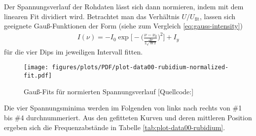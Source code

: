 \noindent Der Spannungsverlauf der Rohdaten lässt sich dann normieren, indem mit dem linearen Fit dividiert wird. Betrachtet man das Verhältnis $U/U_{\text{fit}}$,
lassen sich geeignete Gauß-Funktionen der Form (siehe zum Vergleich \eqref{eq:gauss-intensity})
\begin{align}
    I(\nu) = - I_{0} \exp \biggl[- \biggl( \frac{\nu - \nu_{0}}{\frac{\Delta \nu}{2 \sqrt{\ln 2}}} \biggr)^2 \biggr] + I_{y}
    \label{eq:gauss-fit}
\end{align}
für die vier Dips im jeweiligen Intervall fitten.
\begin{figure}[H]
    \centering
    \texttt{[image: figures/plots/PDF/plot-data00-rubidium-normalized-fit.pdf]}
    \caption{Gauß-Fits für normierten Spannungsverlauf [Quellcode:]}
    \label{fig:plot-data00-rubidium-normalized-fit}
\end{figure}
\noindent Die vier Spannungsminima werden im Folgenden von links nach rechts von \#1 bis \#4 durchnummeriert. Aus den gefitteten Kurven und deren mittleren Position ergeben sich die Frequenzabstände in Tabelle \ref{tab:plot-data00-rubidium}. 
